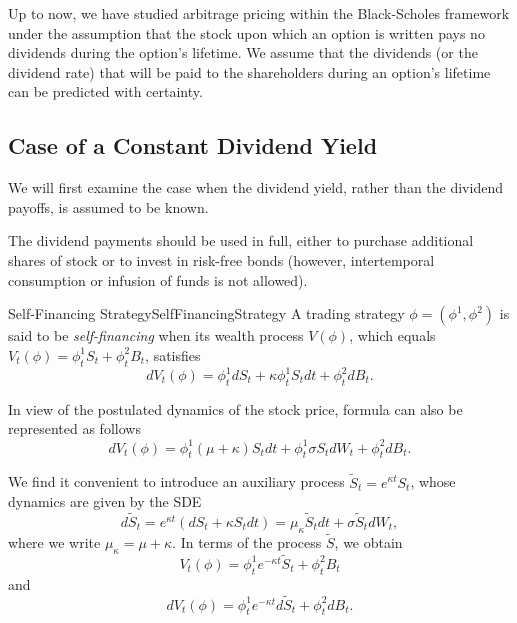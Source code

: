 Up to now, we have studied arbitrage pricing within the Black-Scholes framework under the assumption that the stock upon which an option is written pays no dividends during the option’s lifetime. We assume that the dividends (or the dividend rate) that will be paid to the shareholders during an option’s lifetime can be predicted with certainty.

\subsection{Case of a Constant Dividend Yield}
We will first examine the case when the dividend yield, rather than the dividend payoffs, is assumed to be known.

The dividend payments should be used in full, either to purchase additional shares of stock or to invest in risk-free bonds (however, intertemporal consumption or infusion of funds is not allowed).

\begin{defn}{Self-Financing Strategy}{SelfFinancingStrategy}
	A trading strategy $\phi = (\phi^1, \phi^2)$ is said to be \textit{self-financing} when its wealth process $V(\phi)$, which equals $V_t(\phi) = \phi^1_t S_t + \phi^2_t B_t$, satisfies
	\begin{equation}
		dV_t(\phi) = \phi^1_t dS_t + \kappa \phi^1_t S_t dt + \phi^2_t dB_t.
		\label{eq:WealthDynamicsBasic}
	\end{equation}
\end{defn}

In view of the postulated dynamics of the stock price, formula  can also be represented as follows
\begin{equation}
	dV_t(\phi) = \phi^1_t(\mu + \kappa)S_t dt + \phi^1_t \sigma S_t dW_t + \phi^2_t dB_t.
	\label{eq:WealthDynamicsExpanded}
\end{equation}

We find it convenient to introduce an auxiliary process $\tilde{S}_t = e^{\kappa t} S_t$, whose dynamics are given by the SDE
\begin{equation}
	d\tilde{S}_t = e^{\kappa t}(dS_t + \kappa S_t dt) = \mu_\kappa \tilde{S}_t dt + \sigma \tilde{S}_t dW_t,
	\label{eq:AuxiliaryProcessDynamics}
\end{equation}
where we write $\mu_\kappa = \mu + \kappa$. In terms of the process $\tilde{S}$, we obtain
\begin{equation}
	V_t(\phi) = \phi^1_t e^{-\kappa t} \tilde{S}_t + \phi^2_t B_t
	\label{eq:WealthProcessAuxiliary}
\end{equation}
and
\begin{equation}
	dV_t(\phi) = \phi^1_t e^{-\kappa t} d\tilde{S}_t + \phi^2_t dB_t.
	\label{eq:WealthDifferentialAuxiliary}
\end{equation}


